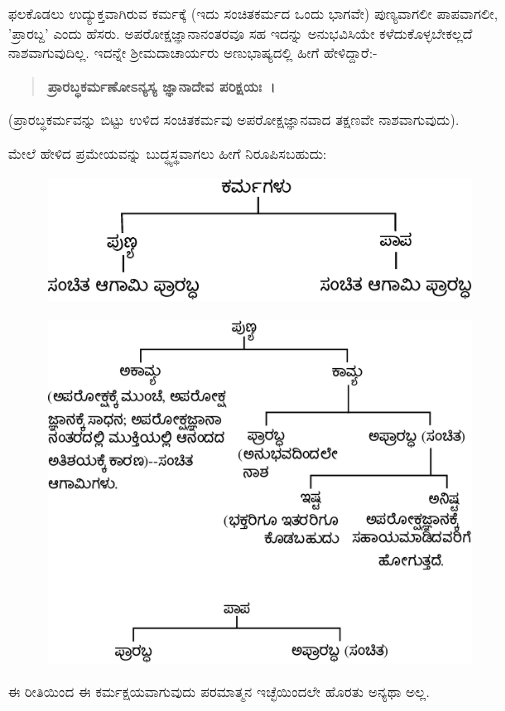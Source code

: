 ಫಲಕೊಡಲು ಉದ್ಯುಕ್ತವಾಗಿರುವ ಕರ್ಮಕ್ಕೆ (ಇದು ಸಂಚಿತಕರ್ಮದ ಒಂದು ಭಾಗವೇ) ಪುಣ್ಯವಾಗಲೀ ಪಾಪವಾಗಲೀ, 'ಪ್ರಾರಬ್ದ' ಎಂದು ಹೆಸರು. ಅಪರೋಕ್ಷಜ್ಞಾನಾನಂತರವೂ ಸಹ ಇದನ್ನು ಅನುಭವಿಸಿಯೇ ಕಳೆದುಕೊಳ್ಳಬೇಕಲ್ಲದೆ ನಾಶವಾಗುವುದಿಲ್ಲ. ಇದನ್ನೇ ಶ‍್ರೀಮದಾಚಾರ್ಯರು ಅಣುಭಾಷ್ಯದಲ್ಲಿ ಹೀಗೆ ಹೇಳಿದ್ದಾರೆ:-

\begin{verse}
\textbf{ಪ್ರಾರಬ್ಧಕರ್ಮಣೋಽನ್ಯಸ್ಯ ಜ್ಞಾನಾದೇವ ಪರಿಕ್ಷಯಃ~।}
\end{verse}

(ಪ್ರಾರಬ್ಧಕರ್ಮವನ್ನು ಬಿಟ್ಟು ಉಳಿದ ಸಂಚಿತಕರ್ಮವು ಅಪರೋಕ್ಷಜ್ಞಾನವಾದ ತಕ್ಷಣವೇ ನಾಶವಾಗುವುದು).

ಮೇಲೆ ಹೇಳಿದ ಪ್ರಮೇಯವನ್ನು ಬುದ್ಧ್ಯಸ್ಥವಾಗಲು ಹೀಗೆ ನಿರೂಪಿಸಬಹುದು:

\begin{figure}[!htbp]
\includegraphics[scale=.95]{images/fig3.jpg}
\end{figure}


\begin{figure}[!htbp]
\includegraphics[scale=.95]{images/fig4.jpg}
\end{figure}

ಈ ರೀತಿಯಿಂದ ಈ ಕರ್ಮಕ್ಷಯವಾಗುವುದು ಪರಮಾತ್ಮನ ಇಚ್ಛೆಯಿಂದಲೇ ಹೊರತು ಅನ್ಯಥಾ ಅಲ್ಲ.

